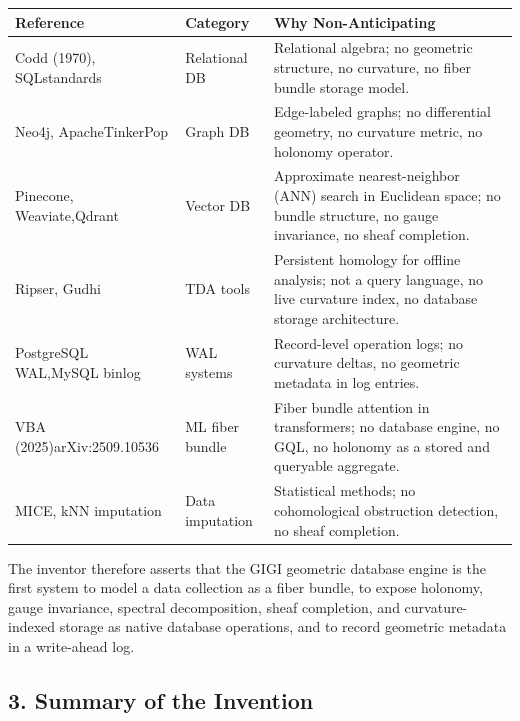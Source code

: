 \documentclass[11pt,letterpaper]{article}
\begin{document}
\begin{center}
\begin{tabular}{@{}p{3.2cm}p{3.4cm}p{7.0cm}@{}}
\toprule
\textbf{Reference} & \textbf{Category} & \textbf{Why Non-Anticipating} \\
\midrule
Codd (1970), SQL\newline standards & Relational DB & Relational algebra; no geometric structure, no curvature, no fiber bundle storage model. \\[4pt]
Neo4j, Apache\newline TinkerPop & Graph DB & Edge-labeled graphs; no differential geometry, no curvature metric, no holonomy operator. \\[4pt]
Pinecone, Weaviate,\newline Qdrant & Vector DB & Approximate nearest-neighbor (ANN) search in Euclidean space; no bundle structure, no gauge invariance, no sheaf completion. \\[4pt]
Ripser, Gudhi & TDA tools & Persistent homology for offline analysis; not a query language, no live curvature index, no database storage architecture. \\[4pt]
PostgreSQL WAL,\newline MySQL binlog & WAL systems & Record-level operation logs; no curvature deltas, no geometric metadata in log entries. \\[4pt]
VBA (2025)\newline arXiv:2509.10536 & ML fiber bundle & Fiber bundle attention in transformers; no database engine, no GQL, no holonomy as a stored and queryable aggregate. \\[4pt]
MICE, kNN imputation & Data imputation & Statistical methods; no cohomological obstruction detection, no sheaf completion. \\
\bottomrule
\end{tabular}
\end{center}

The inventor therefore asserts that the GIGI geometric database engine is the first system to model a data collection as a fiber bundle, to expose holonomy, gauge invariance, spectral decomposition, sheaf completion, and curvature-indexed storage as native database operations, and to record geometric metadata in a write-ahead log.


\subsection*{3. Summary of the Invention}
\end{document}
